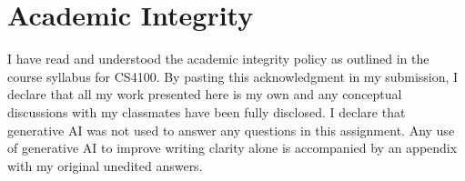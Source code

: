 \documentclass[a4paper]{article}
\begin{document}
\section{Academic Integrity}
I have read and understood the academic integrity policy as outlined in the course syllabus for CS4100. By pasting
this acknowledgment in my submission, I declare that all my work presented here is my own and any conceptual 
discussions with my classmates have been fully disclosed. I declare that generative AI was not used to 
answer any questions in this assignment. Any use of generative AI to improve writing clarity alone is 
accompanied by an appendix with my original unedited answers.
\end{document}
